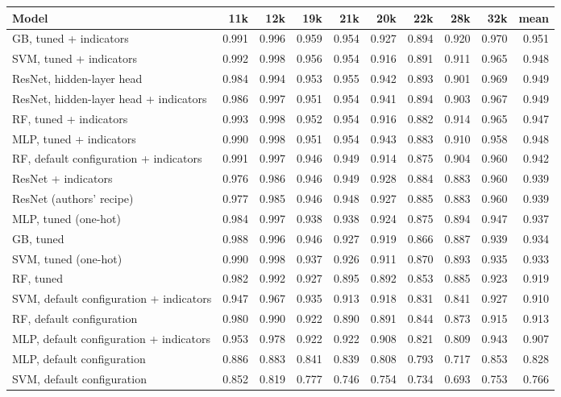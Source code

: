 \begin{tabular}{lrrrrrrrrr}
\toprule
Model & 11k & 12k & 19k & 21k & 20k & 22k & 28k & 32k & mean \\
\midrule
GB, tuned + indicators & 0.991 & 0.996 & 0.959 & 0.954 & 0.927 & 0.894 & 0.920 & 0.970 & 0.951 \\
SVM, tuned + indicators & 0.992 & 0.998 & 0.956 & 0.954 & 0.916 & 0.891 & 0.911 & 0.965 & 0.948 \\
ResNet, hidden-layer head & 0.984 & 0.994 & 0.953 & 0.955 & 0.942 & 0.893 & 0.901 & 0.969 & 0.949 \\
ResNet, hidden-layer head + indicators & 0.986 & 0.997 & 0.951 & 0.954 & 0.941 & 0.894 & 0.903 & 0.967 & 0.949 \\
RF, tuned + indicators & 0.993 & 0.998 & 0.952 & 0.954 & 0.916 & 0.882 & 0.914 & 0.965 & 0.947 \\
MLP, tuned + indicators & 0.990 & 0.998 & 0.951 & 0.954 & 0.943 & 0.883 & 0.910 & 0.958 & 0.948 \\
RF, default configuration + indicators & 0.991 & 0.997 & 0.946 & 0.949 & 0.914 & 0.875 & 0.904 & 0.960 & 0.942 \\
ResNet + indicators & 0.976 & 0.986 & 0.946 & 0.949 & 0.928 & 0.884 & 0.883 & 0.960 & 0.939 \\
ResNet (authors' recipe) & 0.977 & 0.985 & 0.946 & 0.948 & 0.927 & 0.885 & 0.883 & 0.960 & 0.939 \\
MLP, tuned (one-hot) & 0.984 & 0.997 & 0.938 & 0.938 & 0.924 & 0.875 & 0.894 & 0.947 & 0.937 \\
GB, tuned & 0.988 & 0.996 & 0.946 & 0.927 & 0.919 & 0.866 & 0.887 & 0.939 & 0.934 \\
SVM, tuned (one-hot) & 0.990 & 0.998 & 0.937 & 0.926 & 0.911 & 0.870 & 0.893 & 0.935 & 0.933 \\
RF, tuned & 0.982 & 0.992 & 0.927 & 0.895 & 0.892 & 0.853 & 0.885 & 0.923 & 0.919 \\
SVM, default configuration + indicators & 0.947 & 0.967 & 0.935 & 0.913 & 0.918 & 0.831 & 0.841 & 0.927 & 0.910 \\
RF, default configuration & 0.980 & 0.990 & 0.922 & 0.890 & 0.891 & 0.844 & 0.873 & 0.915 & 0.913 \\
MLP, default configuration + indicators & 0.953 & 0.978 & 0.922 & 0.922 & 0.908 & 0.821 & 0.809 & 0.943 & 0.907 \\
MLP, default configuration & 0.886 & 0.883 & 0.841 & 0.839 & 0.808 & 0.793 & 0.717 & 0.853 & 0.828 \\
SVM, default configuration & 0.852 & 0.819 & 0.777 & 0.746 & 0.754 & 0.734 & 0.693 & 0.753 & 0.766 \\
\bottomrule
\end{tabular}
